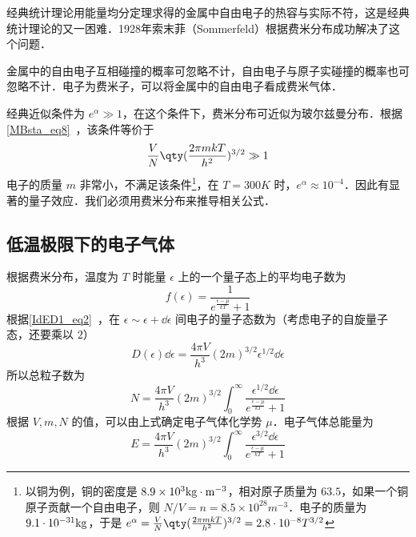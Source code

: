 

经典统计理论用能量均分定理求得的金属中自由电子的热容与实际不符，这是经典统计理论的又一困难．1928年索末菲（Sommerfeld）根据费米分布成功解决了这个问题．

金属中的自由电子互相碰撞的概率可忽略不计，自由电子与原子实碰撞的概率也可忽略不计．电子为费米子，可以将金属中的自由电子看成费米气体．

经典近似条件为 $e^{\alpha}\gg 1$，在这个条件下，费米分布可近似为玻尔兹曼分布．根据\autoref{MBsta_eq8}~，该条件等价于
\begin{equation}
\frac{V}{N}\qty(\frac{2\pi mkT}{h^2})^{3/2}\gg 1
\end{equation}
电子的质量 $m$ 非常小，不满足该条件\footnote{以铜为例，铜的密度是 $8.9\times 10^3 \rm{kg\cdot m^{-3}}$，相对原子质量为 $63.5$，如果一个铜原子贡献一个自由电子，则 $N/V=n=8.5\times 10^{28} m^{-3}$．电子的质量为 $9.1\cdot 10^{-31} \rm{kg}$，于是 $e^\alpha=\frac{V}{N}\qty(\frac{2\pi m kT}{h^2})^{3/2}=2.8\cdot 10^{-8}T^{3/2}$}，在 $T=300K$ 时，$e^\alpha\approx 10^{-4}$．因此有显著的量子效应．我们必须用费米分布来推导相关公式．

\subsection{低温极限下的电子气体}
根据费米分布，温度为 $T$ 时能量 $\epsilon$ 上的一个量子态上的平均电子数为
\begin{equation}\label{mfcgas_eq4}
f(\epsilon)=\frac{1}{e^{\frac{\epsilon-\mu}{kT}}+1}
\end{equation}
根据\autoref{IdED1_eq2}~，在 $\epsilon\sim\epsilon+\dd \epsilon$ 间电子的量子态数为（考虑电子的自旋量子态，还要乘以 $2$）
\begin{equation}
D(\epsilon) \dd \epsilon = \frac{4\pi V}{h^3}(2m)^{3/2}\epsilon^{1/2}\dd \epsilon
\end{equation}
所以总粒子数为
\begin{equation}\label{mfcgas_eq1}
N=\frac{4\pi V}{h^3}(2m)^{3/2}\int_0^\infty \frac{\epsilon^{1/2}\dd \epsilon}{e^{\frac{\epsilon-\mu}{kT}}+1}
\end{equation}
根据 $V,m,N$ 的值，可以由上式确定电子气体化学势 $\mu$．电子气体总能量为
\begin{equation}\label{mfcgas_eq2}
E=\frac{4\pi V}{h^3}(2m)^{3/2}\int_0^\infty \frac{\epsilon^{3/2}\dd \epsilon}{e^{\frac{\epsilon-\mu}{kT}}+1}
\end{equation}

